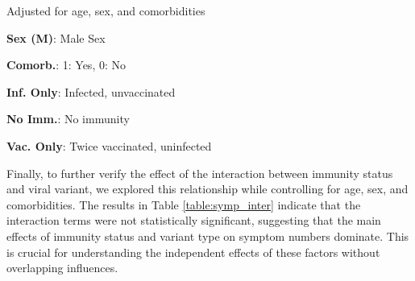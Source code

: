 \documentclass[11pt]{article}
\begin{document}
\begin{table}[h]
\caption{\protect\hyperlink{file-table-1-pkl}{Association between symptom numbers and immunity group}}
\label{table:symp_grp}
\begin{threeparttable}
\renewcommand{\TPTminimum}{\linewidth}
\begin{tablenotes}
\footnotesize
\item Adjusted for age, sex, and comorbidities
\item \textbf{Sex (M)}: Male Sex
\item \textbf{Comorb.}: 1: Yes, 0: No
\item \textbf{Inf. Only}: Infected, unvaccinated
\item \textbf{No Imm.}: No immunity
\item \textbf{Vac. Only}: Twice vaccinated, uninfected
\end{tablenotes}
\end{threeparttable}
\end{table}

Finally, to further verify the effect of the interaction between immunity status and viral variant, we explored this relationship while controlling for age, sex, and comorbidities. The results in Table \ref{table:symp_inter} indicate that the interaction terms were not statistically significant, suggesting that the main effects of immunity status and variant type on symptom numbers dominate. This is crucial for understanding the independent effects of these factors without overlapping influences.
\end{document}
